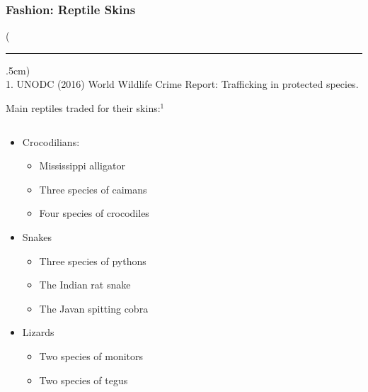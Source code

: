 \documentclass[10pt]{beamer}
\newenvironment{reference}[2]{%
	\begin{textblock*}{\textwidth}(#1,#2)
		\tiny\bgroup\color{gray}}{\egroup\end{textblock*}}
\begin{document}
\begin{frame}[t]
\frametitle{Fashion: Reptile Skins}
\vspace{0.5cm}

	\begin{reference}{4mm}{92mm}
		\rule{1.5cm}{0.25pt}\\
		1. UNODC (2016) World Wildlife Crime Report: Trafficking in protected species.
	\end{reference}
	
	Main reptiles traded for their skins:$^{1}$\\
	
	\begin{columns}[t]
		\begin{column}{0.6\textwidth}
			\begin{itemize}
			\item Crocodilians:
				\begin{itemize}
					\item Mississippi alligator
					\item Three species of caimans
					\item Four species of crocodiles
				\end{itemize}
			\medskip
			\item Snakes
				\begin{itemize}
					\item Three species of pythons
					\item The Indian rat snake
					\item The Javan spitting cobra
				\end{itemize}		
			\medskip
			\item Lizards
				\begin{itemize}
					\item Two species of monitors
					\item Two species of tegus
				\end{itemize}	
			\end{itemize}
		\end{column}
		

\end{columns}
\end{frame}
\end{document}
